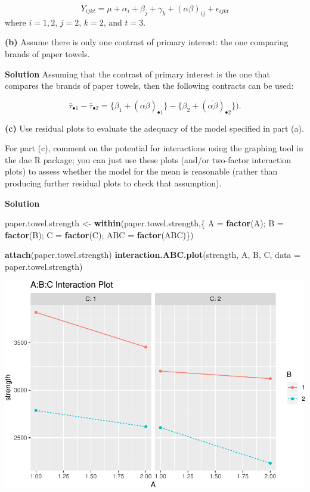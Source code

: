 \documentclass[12pt,]{article}
\newenvironment{Shaded}{\begin{snugshade}}{\end{snugshade}}
\newcommand{\KeywordTok}[1]{\textcolor[rgb]{0.13,0.29,0.53}{\textbf{#1}}}
\newcommand{\DataTypeTok}[1]{\textcolor[rgb]{0.13,0.29,0.53}{#1}}
\newcommand{\StringTok}[1]{\textcolor[rgb]{0.31,0.60,0.02}{#1}}
\newcommand{\NormalTok}[1]{#1}
\begin{document}
\[
Y_{ijk t} = \mu + \alpha_i + \beta_j + \gamma_k + (\alpha \beta)_{ij} + \epsilon_{ijk t}
\] where \(i = 1, 2\), \(j = 2\), \(k= 2\), and \(t=3\).

\textbf{(b)} Assume there is only one contrast of primary interest: the
one comparing brands of paper towels.

\textbf{Solution} Assuming that the contrast of primary interest is the
one that compares the brands of paper towels, then the following
contracts can be used:

\[
\bar{\tau}_{\bullet 1} - \bar{\tau}_{\bullet 2} = \{\beta_1 + (\bar{\alpha \beta})_{\bullet 1} \} - \{\beta_2 + (\bar{\alpha \beta})_{\bullet 2} \}).
\]

\textbf{(c)} Use residual plots to evaluate the adequacy of the model
specified in part (a).

For part (c), comment on the potential for interactions using the
graphing tool in the dae R package; you can just use these plots (and/or
two-factor interaction plots) to assess whether the model for the mean
is reasonable (rather than producing further residual plots to check
that assumption).

\textbf{Solution}

\begin{Shaded}
\begin{Highlighting}[]
\NormalTok{paper.towel.strength <-}\StringTok{ }\KeywordTok{within}\NormalTok{(paper.towel.strength,\{}
\NormalTok{  A =}\StringTok{ }\KeywordTok{factor}\NormalTok{(A); B =}\StringTok{ }\KeywordTok{factor}\NormalTok{(B); C =}\StringTok{ }\KeywordTok{factor}\NormalTok{(C); ABC =}\StringTok{ }\KeywordTok{factor}\NormalTok{(ABC)\})}

\KeywordTok{attach}\NormalTok{(paper.towel.strength)}
\KeywordTok{interaction.ABC.plot}\NormalTok{(strength, A, B, C, }\DataTypeTok{data =}\NormalTok{ paper.towel.strength)}
\end{Highlighting}
\end{Shaded}

\includegraphics{Markdown_HW_7_files/figure-latex/unnamed-chunk-2-1.pdf}
\end{document}
